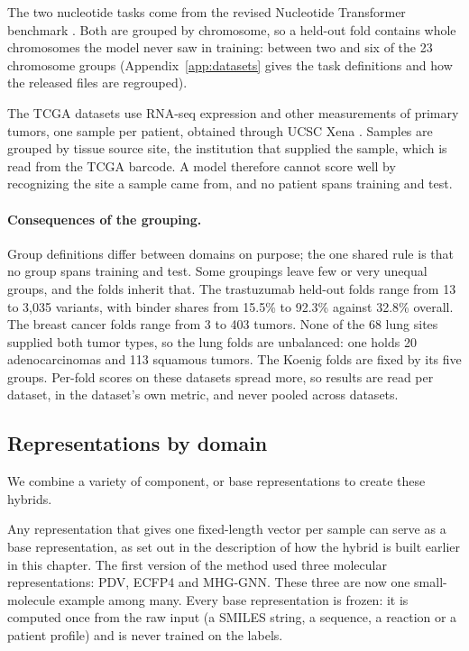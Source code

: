 The two nucleotide tasks come from the revised Nucleotide Transformer benchmark \citep{DallaTorre2025}. Both are grouped by chromosome, so a held-out fold contains whole chromosomes the model never saw in training: between two and six of the 23 chromosome groups (Appendix~\ref{app:datasets} gives the task definitions and how the released files are regrouped).

The TCGA datasets use RNA-seq expression and other measurements of primary tumors, one sample per patient, obtained through UCSC Xena \citep{Goldman2020}. Samples are grouped by tissue source site, the institution that supplied the sample, which is read from the TCGA barcode. A model therefore cannot score well by recognizing the site a sample came from, and no patient spans training and test.

\paragraph{Consequences of the grouping.} Group definitions differ between domains on purpose; the one shared rule is that no group spans training and test. Some groupings leave few or very unequal groups, and the folds inherit that. The trastuzumab held-out folds range from 13 to 3,035 variants, with binder shares from 15.5\% to 92.3\% against 32.8\% overall. The breast cancer folds range from 3 to 403 tumors. None of the 68 lung sites supplied both tumor types, so the lung folds are unbalanced: one holds 20 adenocarcinomas and 113 squamous tumors. The Koenig folds are fixed by its five groups. Per-fold scores on these datasets spread more, so results are read per dataset, in the dataset's own metric, and never pooled across datasets.
\subsection{Representations by domain}

We combine a variety of component, or base representations to create these hybrids.

Any representation that gives one fixed-length vector per sample can serve as a base representation, as set out in the description of how the hybrid is built earlier in this chapter. The first version of the method used three molecular representations: PDV, ECFP4 and MHG-GNN. These three are now one small-molecule example among many. Every base representation is frozen: it is computed once from the raw input (a SMILES string, a sequence, a reaction or a patient profile) and is never trained on the labels.

